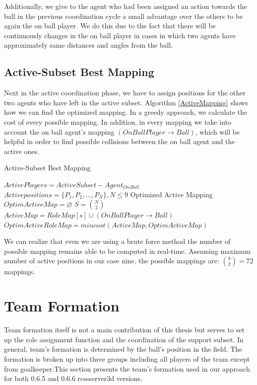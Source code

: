 Additionally, we give to the agent who had been assigned an action towards the ball in the previous coordination cycle a small
advantage over the others to be again the on ball player. We do this due to the fact that there will be continuously changes in the on ball player in cases in which two agents have approximately same distances and angles from the ball.



\subsection{Active-Subset Best Mapping}
Next in the active coordination phase, we have to assign positions for the other two agents who have left in the active subset. Algorithm \ref{ActiveMapping} shows how we can find the optimized mapping. In a greedy approach, we calculate the cost of every possible mapping. In addition, in every mapping we take into account the on ball agent's mapping $(OnBallPlayer \rightarrow Ball)$, which will be helpful in order to find possible collisions between the on ball agent and the active ones.
\begin{algorithm}[htb!]
\caption{Active-Subset Best Mapping}
\label{ActiveMapping}
\begin{algorithmic}[1]
$ActivePlayers = ActiveSubset - Agent_{OnBall} $
$Activepositions = \lbrace P_{1},P_{2},...,P_{N} \rbrace, N\leq 9 $
Optimized Active Mapping
\STATE $OptimActiveMap = \varnothing $
\STATE $S = {{N}\choose{2}}$
\STATE $ActiveMap = RoleMap[s] \cup (OnBallPlayer \rightarrow Ball)$
\STATE $OptimActiveRoleMap = mincost(ActiveMap,OptimActiveMap)$
\ENDFOR
\end{algorithmic}
\end{algorithm}
We can realize that even we are using a brute force method the number of possible mapping remains able to be computed in real-time. Assuming maximum number of active positions in our case nine, the possible mappings are: ${{9}\choose{2}} = 72$ mappings.

\section{Team Formation}
Team formation itself is not a main contribution of this thesis but serves to set up the role assignment function and the coordination of the support subset. In general, team's formation is determined by the ball's position in the field. The formation is broken up into three groups including all players of the team except from goalkeeper.This section presents the team's formation used in our approach for both 0.6.5 and 0.6.6 rcssserver3d versions.
